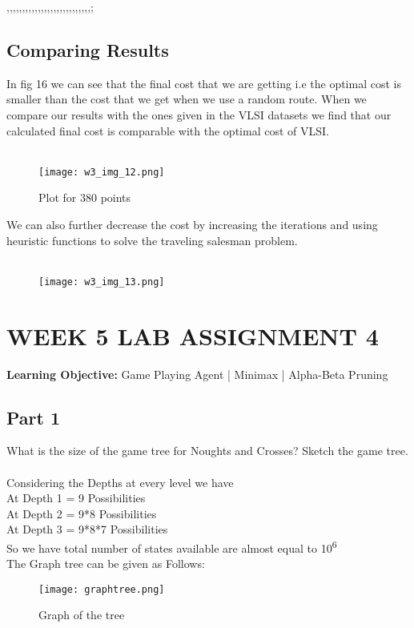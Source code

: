 ,,,,,,,,,,,,,,,,,,,,,,,,,,,;\documentclass[conference]{IEEEtran}
\begin{document}
\subsection{Comparing Results}
In fig 16 we can see that the final cost that we are getting i.e the optimal cost is smaller than the cost that we get when we use a random route. When we compare our results with the ones given in the VLSI datasets we find that our calculated final cost is comparable with the optimal cost of VLSI.
\\
\\
\begin{figure}[htbp]
\centerline{\texttt{[image: w3\_img\_12.png]}}
\caption{Plot for 380 points}
\label{fig}
\end{figure}
We can also further decrease the cost by increasing the iterations and using heuristic functions to solve the traveling salesman problem.
\\
\\
\begin{figure}[htbp]
\centerline{\texttt{[image: w3\_img\_13.png]}}

\label{fig}
\end{figure}






\section{WEEK 5 LAB ASSIGNMENT 4}
\textbf{Learning Objective:} Game Playing Agent | Minimax |
Alpha-Beta Pruning

\subsection{Part 1}
What is the size of the game tree for Noughts and Crosses? Sketch the game tree.
\\
\\
Considering the Depths at every level we have
\\
At Depth 1 = 9 Possibilities
\\
At Depth 2 = 9*8 Possibilities
\\ 
At Depth 3 = 9*8*7 Possibilities
\\
So we have total number of states available are almost equal to 10\textsuperscript{6} 
\\
The Graph tree can be given as Follows:
\newline
\begin{figure}[htbp]
\centerline{\texttt{[image: graphtree.png]}}
\caption{Graph of the tree}
\label{fig}
\end{figure}
\\
\\
\end{document}
